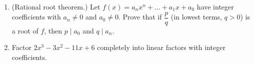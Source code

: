 \begin{enumerate}
\item[(a)] (Rational root theorem.) Let $f(x)=a_nx^n+\dots+a_1x+a_0$ have integer coefficients with $a_n\ne0$ and $a_0\ne0$. Prove that if $\dfrac {p}{q}$ (in lowest terms, $q>0$) is a root of $f$, then $p\mid a_0$ and $q\mid a_n$.
\item[(b)] Factor $2x^3-3x^2-11x+6$ completely into linear factors with integer coefficients.
\end{enumerate}
